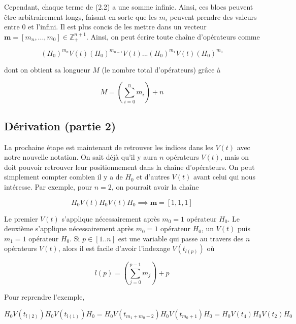 Cependant, chaque terme de (2.2) a une somme infinie. Ainsi, ces blocs peuvent être arbitrairement longs, faisant en sorte que les $m_i$ peuvent prendre des valeurs entre 0 et l'infini. Il est plus concis de les mettre dans un vecteur $\boldsymbol{m} = \left[m_n, ..., m_0\right] \in \mathbb{Z}^{n+1}_+$. Ainsi, on peut écrire toute chaîne d'opérateurs comme 

\begin{equation}
    (H_0)^{m_n}V(t)(H_0)^{m_{n-1}}V(t)...(H_0)^{m_1}V(t)(H_0)^{m_0}
\end{equation}

dont on obtient sa longueur $M$ (le nombre total d'opérateurs) grâce à 

\begin{equation}
    M = \left(\sum_{i=0}^{n}m_i\right) + n
\end{equation}

\subsection{Dérivation (partie 2)}
La prochaine étape est maintenant de retrouver les indices dans les $V(t)$ avec notre nouvelle notation. On sait déjà qu'il y aura $n$ opérateurs $V(t)$, mais on doit pouvoir retrouver leur positionnement dans la chaîne d'opérateurs. On peut simplement compter combien il y a de $H_0$ et d'autres $V(t)$ avant celui qui nous intéresse. Par exemple, pour $n=2$, on pourrait avoir la chaîne

\begin{equation*}
    H_0V(t)H_0V(t)H_0 \implies \boldsymbol{m} = \left[1, 1, 1\right]
\end{equation*}

Le premier $V(t)$ s'applique nécessairement après $m_0 = 1$ opérateur $H_0$. Le deuxième s'applique nécessairement après $m_0 = 1$ opérateur $H_0$, un $V(t)$ puis $m_1 = 1$ opérateur $H_0$. Si $p \in \left[1..n\right]$ est une variable qui passe au travers des $n$ opérateurs $V(t)$, alors il est facile d'avoir l'indexage $V(t_{l(p)})$ où

\begin{equation}
    l(p) = \left(\sum_{j=0}^{p-1}m_j\right) + p
\end{equation}

Pour reprendre l'exemple, 

\begin{equation*}
    H_0V(t_{l(2)})H_0V(t_{l(1)})H_0 = H_0V(t_{m_1 + m_0 + 2})H_0V(t_{m_0 + 1})H_0 = H_0V(t_4)H_0V(t_2)H_0
\end{equation*}

